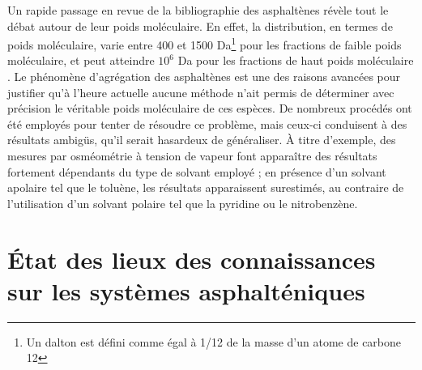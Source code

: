Un rapide passage en revue de la bibliographie des asphaltènes révèle tout le débat autour de leur poids moléculaire. En effet, la distribution, en termes de poids moléculaire, varie entre 400 et 1500 Da\footnote{Un dalton est défini comme égal à 1/12 de la masse d'un atome de carbone 12} pour les fractions de faible poids moléculaire, et peut atteindre $10^{6}$ Da pour les fractions de haut poids moléculaire \cite{mullins2008contrasting}. Le phénomène d'agrégation des asphaltènes est une des raisons avancées pour justifier qu'à l'heure actuelle aucune méthode n'ait permis de déterminer avec précision le véritable poids moléculaire de ces espèces. De nombreux procédés ont été employés pour tenter de résoudre ce problème, mais ceux-ci conduisent à des résultats ambigüs, qu'il serait hasardeux de généraliser. À titre d'exemple, des mesures par osméométrie à tension de vapeur font apparaître des résultats fortement dépendants du type de solvant employé ; en présence d'un solvant apolaire tel que le toluène, les résultats apparaissent surestimés, au contraire de l'utilisation d'un solvant polaire tel que la pyridine ou le nitrobenzène. 




\section{État des lieux des connaissances sur les systèmes asphalténiques}

